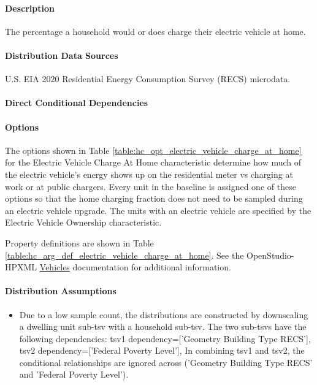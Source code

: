 \paragraph{Description}
% 
The percentage a household would or does charge their electric vehicle at home.

\paragraph{Distribution Data Sources}
% 
U.S. EIA 2020 Residential Energy Consumption Survey (RECS) microdata.

\paragraph{Direct Conditional Dependencies}


\paragraph{Options}
The options shown in Table \ref{table:hc_opt_electric_vehicle_charge_at_home} for the Electric Vehicle Charge At Home characteristic determine how much of the electric vehicle's energy shows up on the residential meter vs charging at work or at public chargers. Every unit in the baseline is assigned one of these options so that the home charging fraction does not need to be sampled during an electric vehicle upgrade. The units with an electric vehicle are specified by the Electric Vehicle Ownership characteristic.



Property definitions are shown in Table \ref{table:hc_arg_def_electric_vehicle_charge_at_home}. See the OpenStudio-HPXML \href{https://openstudio-hpxml.readthedocs.io/en/v1.10.0/workflow_inputs.html#hpxml-vehicles}{Vehicles} documentation for additional information.



\paragraph{Distribution Assumptions}
% 
\begin{itemize}
  \item Due to a low sample count, the distributions are constructed by downscaling a dwelling unit sub-tsv with a household sub-tsv. The two sub-tsvs have the following dependencies: tsv1 dependency=['Geometry Building Type RECS'], tsv2 dependency=['Federal Poverty Level'], In combining tsv1 and tsv2, the conditional relationships are ignored across ('Geometry Building Type RECS' and 'Federal Poverty Level').
\end{itemize}
